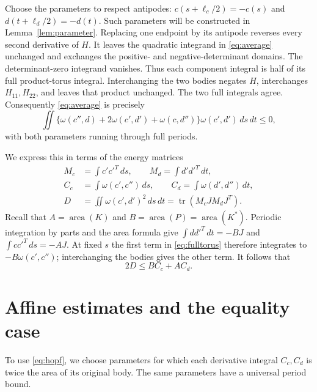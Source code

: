 \documentclass[11pt]{amsart}
\theoremstyle{remark}
\newcommand{\area}{\operatorname{area}}
\newcommand{\tr}{\operatorname{tr}}
\newcommand{\dd}{\,d}
\begin{document}
Choose the parameters to respect antipodes:
$c(s+\ell_c/2)=-c(s)$ and $d(t+\ell_d/2)=-d(t)$.
Such parameters will be constructed in Lemma~\ref{lem:parameter}.
Replacing one endpoint by its antipode reverses every second derivative
of $H$. It leaves the quadratic integrand in \eqref{eq:average}
unchanged and exchanges the positive- and negative-determinant domains.
The determinant-zero integrand vanishes. Thus each component integral is
half of its full product-torus integral. Interchanging the two bodies
negates $H$, interchanges $H_{11},H_{22}$, and leaves that product
unchanged. The two full integrals agree. Consequently
\eqref{eq:average} is precisely
\begin{equation}\label{eq:fulltorus}
\iint\{\omega(c'',d)+2\omega(c',d')+\omega(c,d'')\}
\omega(c',d')\dd s\dd t\leq0,
\end{equation}
with both parameters running through full periods.

We express this in terms of the energy matrices
\begin{equation}\label{eq:energies}
\begin{split}
M_c&=\int c'c'^T\dd s,\qquad M_d=\int d'd'^T\dd t,\\
C_c&=\int\omega(c',c'')\dd s,\qquad
C_d=\int\omega(d',d'')\dd t,\\
D&=\iint\omega(c',d')^2\dd s\dd t
=\tr(M_cJM_dJ^T).
\end{split}
\end{equation}
Recall that $A=\area(K)$ and $B=\area(P)=\area(K^*)$.
Periodic integration by parts and the area formula give
$\int d d'^T\dd t=-BJ$ and $\int c c'^T\dd s=-AJ$.
At fixed $s$ the first term in \eqref{eq:fulltorus} therefore integrates
to $-B\omega(c',c'')$; interchanging the bodies gives the other term.
It follows that
\begin{equation}\label{eq:hopf}
2D\leq BC_c+AC_d.
\end{equation}

\section{Affine estimates and the equality case}\label{sec:affine}

To use \eqref{eq:hopf}, we choose parameters for which each derivative
integral $C_c,C_d$ is twice the area of its original body.
The same parameters have a universal period bound.
\end{document}
